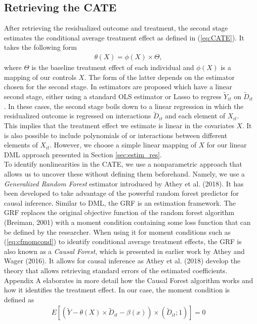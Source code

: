 \subsection{Retrieving the CATE}
After retrieving the residualized outcome and treatment, the second stage estimates the conditional average treatment effect as defined in (\ref{eq:CATE}). It takes the following form
\begin{align} 
    \theta(X)=\phi(X) \times \Theta, \label{eq:CATE}
\end{align} 
where $\Theta$ is the baseline treatment effect of each individual and $\phi(X)$ is a mapping of our controls $X$. The form of the latter depends on the estimator chosen for the second stage. In \cite{DML2017} estimators are proposed which have a linear second stage, either using a standard OLS estimator or Lasso to regress $\tilde{Y}_{it}$ on $\tilde{D}_{it}$. In these cases, the second stage boils down to a linear regression in which the residualized outcome is regressed on interactions $\tilde{D}_{it}$ and each element of $X_{it}$. This implies that the treatment effect we estimate is linear in the covariates $X$. It is also possible to include polynomials of or interactions between different elements of $X_{it}$. However, we choose a simple linear mapping of $X$ for our linear DML approach presented in Section \ref{sec:estim_res}. \\
To identify nonlinearities in the CATE, we use a nonparametric approach that allows us to uncover these without defining them beforehand. Namely, we use a \textit{Generalized Random Forest} estimator introduced by Athey et al. (2018). It has been developed to take advantage of the powerful random forest predictor for causal inference. Similar to DML, the GRF is an estimation framework. The GRF replaces the original objective function of the random forest algorithm (Breiman, 2001) with a moment condition containing some loss function that can be defined by the researcher. When using it for moment conditions such as (\ref{eq:cfmomcond}) to identify conditional average treatment effects, the GRF is also known as a \textit{Causal Forest}, which is presented in earlier work by Athey and Wager (2016). It allows for causal inference as Athey et al. (2018) develop the theory that allows retrieving standard errors of the estimated coefficients. Appendix A elaborates in more detail how the Causal Forest algorithm works and how it identifies the treatment effect. In our case, the moment condition is defined as 
\begin{align}
    E \left[\left(\tilde{Y}- \theta(X) \times \tilde{D}_{it} - \beta(x)\right) \times (\tilde{D}_{it}; 1) \right] = 0 \label{eq:cfmomcond}
\end{align}
